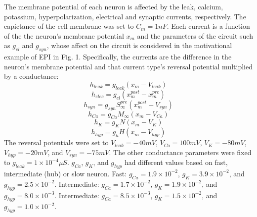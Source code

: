 \documentclass[11pt]{article}
\begin{document}
The membrane potential of each neuron is affected by the leak, calcium, potassium, hyperpolarization,
electrical and synaptic currents, respectively.  The capictance of the cell membrane was set to $C_m = 1nF$. Each current is a function of the the neuron's membrane potential $x_m$ and the parameters of the circuit such as  $g_{el}$ and $g_{syn}$, whose affect on the circuit is considered in the motivational example of EPI in Fig. 1.  Specifically, the currents are the difference in the neuron's membrane potential and that current type's reversal potential multiplied by a conductance:
\begin{equation}  h_{leak} = g_{leak} (x_m - V_{leak}) 
\end{equation} 
\begin{equation}  h_{elec} = g_{el} (x_m^{post} - x_m^{pre})
\end{equation} 
\begin{equation}  h_{syn} = g_{syn} S_\infty^{pre} (x_m^{post} - V_{syn}) \end{equation} 
\begin{equation}  h_{Ca} = g_{Ca} M_\infty (x_m - V_{Ca}) 
\end{equation} 
\begin{equation}  h_K = g_K N (x_m - V_K) 
\end{equation} 
\begin{equation}  h_{hyp} = g_h H(x_m - V_{hyp})
\end{equation} 
The reversal potentials were set to $V_{leak} = -40mV$, $V_{Ca} = 100mV$, $V_K = -80mV$, $V_{hyp} = -20mV$, and $V_{syn} = -75mV$.  The other conductance parameters were fixed to $g_{leak} = 1 \times 10^{-4} \mu S$. $g_{Ca}$, $g_{K}$, and $g_{hyp}$ had different values based on fast, intermediate (hub) or slow neuron.  Fast: $g_{Ca} = 1.9 \times 10^{-2}$, $ g_K = 3.9 \times 10^{-2} $, and $ g_{hyp} = 2.5 \times 10^{-2} $.  Intermediate: $g_{Ca} = 1.7 \times 10^{-2}$, $ g_K = 1.9 \times 10^{-2} $, and $ g_{hyp} = 8.0 \times 10^{-3} $.  Intermediate: $g_{Ca} = 8.5 \times 10^{-3}$, $ g_K = 1.5 \times 10^{-2} $, and $ g_{hyp} = 1.0 \times 10^{-2} $.
\end{document}
